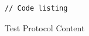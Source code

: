 \documentclass{article}
\begin{document}
\begin{lstlisting}[style=pdcode]
// Code listing
\end{lstlisting}
\begin{lsprotocol}{Test Protocol}
Content
\end{lsprotocol}
\end{document}
